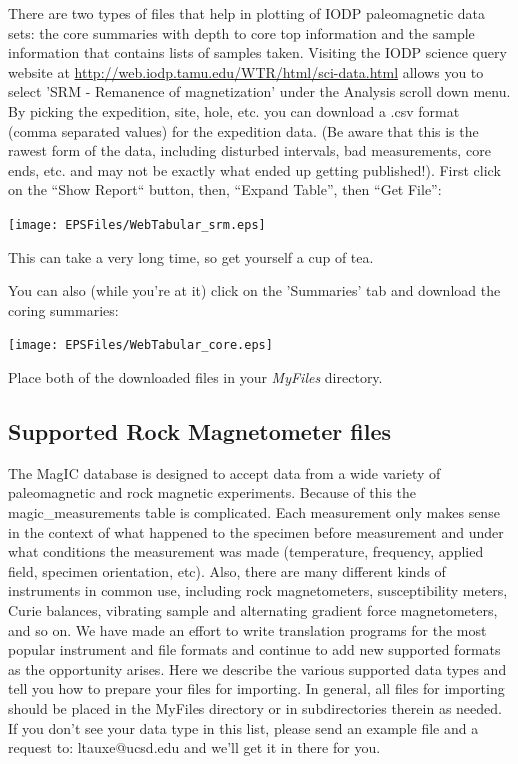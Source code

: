 \documentclass[11pt]{book}
\begin{document}
{There are two types of files that help in plotting of IODP paleomagnetic data sets: the core summaries with depth to core top information and the sample information that contains lists of samples taken.
Visiting the IODP science query website at \url{http://web.iodp.tamu.edu/WTR/html/sci-data.html} allows you to
select 'SRM - Remanence of magnetization' under the Analysis scroll down menu.  By picking the expedition, site, hole, etc. you can download a  .csv format (comma separated values) for the expedition data.  (Be aware that this is the rawest form of the data, including disturbed intervals, bad measurements, core ends, etc. and may not be exactly what ended up getting published!).   First click on the ``Show Report`` button, then, ``Expand Table'', then ``Get File'':

\texttt{[image: EPSFiles/WebTabular\_srm.eps]}

This can take a very long time, so get yourself a cup of tea.

You can also (while you're at it) click on the 'Summaries' tab and download the coring summaries:

\texttt{[image: EPSFiles/WebTabular\_core.eps]}

Place both of the downloaded files in your {\it MyFiles} directory.



\subsection{Supported Rock Magnetometer files}

The MagIC database is designed to accept data from a wide variety of paleomagnetic and rock magnetic experiments. Because of this the magic\_measurements table is complicated. Each measurement only makes sense in the context of what happened to the specimen before measurement and under what conditions the measurement was made (temperature, frequency, applied field, specimen orientation, etc). Also, there are many different kinds of instruments in common use, including rock magnetometers, susceptibility meters, Curie balances, vibrating sample and alternating gradient force magnetometers, and so on. We have made an effort to write translation programs for the most popular instrument and file formats and continue to add new supported formats as the opportunity arises. Here we describe the various supported data types and tell you how to prepare your files for importing. In general, all files for importing should be placed in the MyFiles directory or in subdirectories therein as needed.  If you don't see your data type in this list, please send an example file and a request to:  ltauxe@ucsd.edu and we'll get it in there for you.


}
\end{document}
